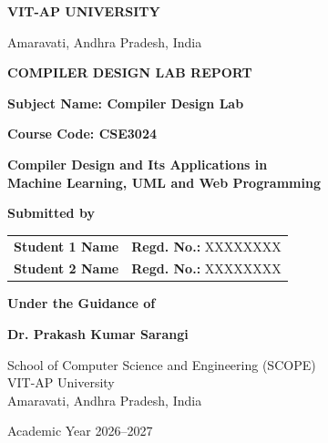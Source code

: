 \documentclass[12pt,a4paper]{article}
\begin{document}
\begin{titlepage}
\begin{center}

\vspace*{0.5cm}

{\Large\bfseries
VIT-AP UNIVERSITY
}


\vspace{0.3cm}

{\large
Amaravati, Andhra Pradesh, India
}

\vspace{0.8cm}


\vspace{0.4cm}

{\Large\bfseries
COMPILER DESIGN LAB REPORT
}

\vspace{0.4cm}

{\large
\textbf{Subject Name: Compiler Design Lab}
}

\vspace{0.15cm}

{\large
\textbf{Course Code: CSE3024}
}

\vspace{1cm}

{\LARGE\bfseries
Compiler Design and Its Applications in\\
Machine Learning, UML and Web Programming
}

\vspace{1.2cm}

\textbf{Submitted by}

\vspace{0.4cm}

\begin{tabular}{ll}
\textbf{Student 1 Name} & \textbf{Regd. No.:} XXXXXXXX \\[0.4cm]
\textbf{Student 2 Name} & \textbf{Regd. No.:} XXXXXXXX \\
\end{tabular}

\vspace{1.2cm}

\textbf{Under the Guidance of}

\vspace{0.3cm}

\textbf{Dr. Prakash Kumar Sarangi}

\vspace{1cm}



{\large
School of Computer Science and Engineering (SCOPE)\\
VIT-AP University\\
Amaravati, Andhra Pradesh, India
}

\vspace{0.4cm}

{\large
Academic Year 2026--2027
}

\end{center}
\end{titlepage}
\end{document}
